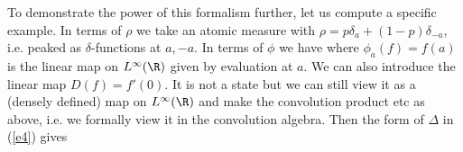 \documentclass[12pt]{article}
\begin{document}
To demonstrate the power of this formalism further, let us compute a specific
example. In terms of $\rho$ we take an atomic measure with
$\rho=p\delta_a+(1-p)\delta_{-a}$, i.e. peaked as $\delta$-functions at $a,-a$.
In terms of $\phi$ we have
where $\phi_a(f)=f(a)$ is the linear map on $L^\infty(\R)$ given by evaluation
at $a$. We can also introduce the linear map $D(f)=f'(0)$. It is not a state
but we can still view it as a (densely defined) map on $L^\infty(\R)$ and make
the convolution product etc as above, i.e. we formally view it in the
convolution algebra. Then the form of $\Delta$ in (\ref{e4}) gives
\end{document}
